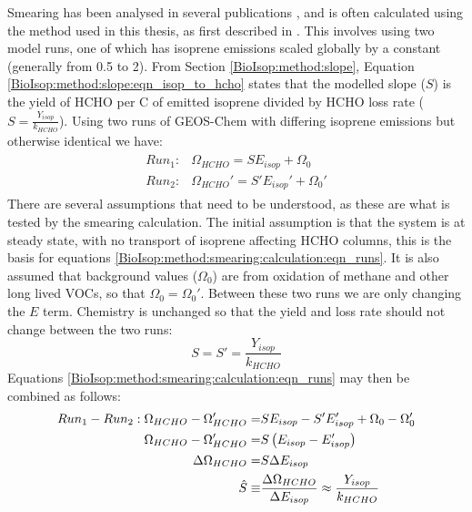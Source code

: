       Smearing has been analysed in several publications \parencite[e.g.][]{Martin2003, Palmer2003, Millet2006, Stavrakou2009, Marais2012, Barkley2013, Zhu2014, Wolfe2016, Surl2018}, and is often calculated using the method used in this thesis, as first described in \textcite{Palmer2003}.
      This involves using two model runs, one of which has isoprene emissions scaled globally by a constant (generally from 0.5 to 2).
      From Section \ref{BioIsop:method:slope}, Equation \ref{BioIsop:method:slope:eqn_isop_to_hcho} states that the modelled slope ($S$) is the yield of HCHO per C of emitted isoprene divided by HCHO loss rate ($S = \frac{Y_{isop}}{k_{HCHO}}$).
      Using two runs of GEOS-Chem with differing isoprene emissions but otherwise identical we have:
      \begin{eqnarray}
        \label{BioIsop:method:smearing:calculation:eqn_runs}
        \begin{split}
        Run_1 :&  \Omega_{HCHO} = S E_{isop} + \Omega_0 \\
        Run_2 :&  \Omega_{HCHO}' = S' E_{isop}' + \Omega_0' 
        \end{split}
      \end{eqnarray}
      There are several assumptions that need to be understood, as these are what is tested by the smearing calculation.
      The initial assumption is that the system is at steady state, with no transport of isoprene affecting HCHO columns, this is the basis for equations \ref{BioIsop:method:smearing:calculation:eqn_runs}.
      It is also assumed that background values ($\Omega_0$) are from oxidation of methane and other long lived VOCs, so that $\Omega_0 = \Omega_0'$.
      Between these two runs we are only changing the $E$ term.
      Chemistry is unchanged so that the yield and loss rate should not change between the two runs: 
      \begin{equation}
        S = S' = \frac{Y_{isop}}{k_{HCHO}}
      \end{equation}
      Equations \ref{BioIsop:method:smearing:calculation:eqn_runs} may then be combined as follows:
      \begin{eqnarray}
        Run_1-Run_2 : \Omega_{HCHO} - \Omega_{HCHO}' = & S E_{isop} - S' E_{isop}' +\Omega_0 - \Omega_0' \notag \\
        \Omega_{HCHO} - \Omega_{HCHO}' = & S \left( E_{isop} - E_{isop}' \right) \notag \\
        \Delta \Omega_{HCHO} = & S \Delta E_{isop}  \notag \\
        \hat{S} \equiv & \frac{\Delta{\Omega_{HCHO}}}{\Delta E_{isop}} \approx \frac{Y_{isop}}{k_{HCHO}} \label{BioIsop:method:smearing:calculation:eqn_hats}
      \end{eqnarray}
